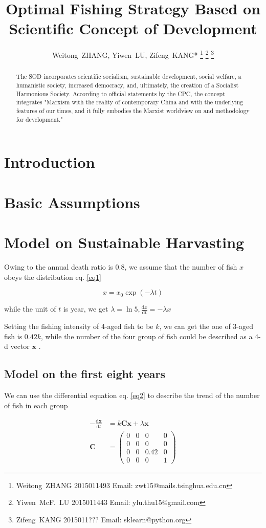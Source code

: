 \documentclass{IEEEtran}
\title{Optimal Fishing Strategy Based on Scientific Concept of Development}
\author{
    Weitong~ZHANG, Yiwen~LU, Zifeng~KANG*
    \thanks{Weitong~ZHANG 2015011493 Email: zwt15@mails.tsinghua.edu.cn}
    \thanks{Yiwen~McF.~LU 2015011443 Email: ylu.thu15@gmail.com}
    \thanks{Zifeng~KANG 2015011??? Email: sklearn@python.org}
}
\begin{document}
\maketitle

\begin{abstract}
    The SOD incorporates scientific socialism, sustainable development, social welfare, a humanistic society, increased democracy, and, ultimately, the creation of a Socialist Harmonious Society. According to official statements by the CPC, the concept integrates "Marxism with the reality of contemporary China and with the underlying features of our times, and it fully embodies the Marxist worldview on and methodology for development."
\end{abstract}

\section{Introduction}
\section{Basic Assumptions}
\section{Model on Sustainable Harvasting}

Owing to the annual death ratio is 0.8, we assume that the number of fish $x$ obeys the distribution eq. \ref{eq1}

\begin{equation}
    \label{eq1}
    x = x_0 \exp(-\lambda t)
\end{equation}

while the unit of $t$ is year, we get $\lambda = \ln 5, \frac{\mathrm dx}{\mathrm dt} = -\lambda x$

Setting the fishing intensity of 4-aged fish to be $k$, we can get the one of 3-aged fish is $0.42k$, while the number of the four group of fish could be described as a 4-d vector $\bm x$ .

\subsection{Model on the first eight years}

We can use the differential equation eq. \ref{eq2} to describe the trend of the number of fish in each group

\begin{align}
    \label{eq2}
    -\frac{\mathrm d \bm x}{\mathrm d t} &= k \mathbf C \bm x + \lambda \bm x \\
    \mathbf C &= \begin{pmatrix}0&0&0&0\\0&0&0&0\\0&0&0.42&0\\0&0&0&1\end{pmatrix}
\end{align}
\end{document}
